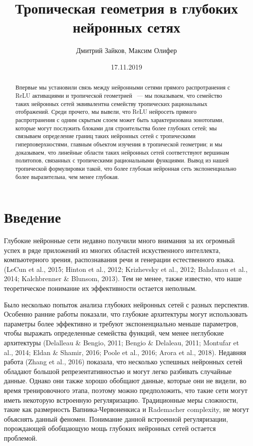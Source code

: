 \documentclass[russian]{lecture-notes}
\title{Тропическая геометрия в глубоких нейронных сетях}
\author{Дмитрий Зайков, Максим Олифер}
\date{17.11.2019}
\begin{document}
	\maketitle
	\newpage
	\begin{abstract}
		Впервые мы установили связь между нейронными сетями прямого распротранения с ReLU активациями и тропической геометрией ~--- мы показываем, что семейство таких нейронных сетей эквивалентна семейству тропических рациональных отображений. Среди прочего, мы вывели, что ReLU нейросеть прямого распротранения с одним скрытым слоем может быть характеризована зонотопами, которые могут послужить блоками для строительства более глубоких сетей; мы связываем определение границ таких нейронных сетей с тропическими гиперповерхностями, главным объектом изучения в тропической геометрии; и мы доказываем, что линейные области таких нейронных сетей соответствуют вершинам политопов, связанных с тропическими рациональными функциями. Вывод из нашей тропической формулировки такой, что более глубокая нейронная сеть экспоненциально более выразительна, чем менее глубокая.
	\end{abstract}
	
	\section{Введение}
	
	Глубокие нейронные сети недавно получили много внимания за их огромный успех в ряде приложений из многих областей искуственного интеллекта, компьютерного зрения, распознавания речи и генерации естественного языка. (LeCun et al., 2015; Hinton et al., 2012; Krizhevsky et al., 2012; Bahdanau et al., 2014; Kalchbrenner \& Blunsom, 2013). Тем не менее, также известно, что наше теоретическое понимание их эффективности остается неполным.
	
	Было несколько попыток анализа глубоких нейронных сетей с разных перспектив. Особенно ранние работы показали, что глубокие архитектуры могут использовать параметры более эффективно и требуют экспоненциально меньше параметров, чтобы выражать определенные семейства функций, чем менее неглубокие архитектуры (Delalleau \& Bengio, 2011; Bengio \& Delaleau, 2011; Montufar et al., 2014; Eldan \& Shamir, 2016; Poole et al., 2016; Arora et al., 2018). Недавняя работа (Zhang et al., 2016) показала, что несколько успешных нейронных сетей обладают большой репрезентативностью и могут легко разбивать случайные данные. Однако они также хорошо обобщают данные, которые они не видели, во время тренировочного этапа, поэтому можно предположить, что такие сети могут иметь некоторую встроенную регуляризацию. Традиционные меры сложности, такие как размерность Вапника-Червоненкиса и Rademacher complexity, не могут объяснять данный феномен. Понимание данной встроенной регуляризации, порождающей обобщающую мощь глубоких нейронных сетей остается проблемой.
	
\end{document}
